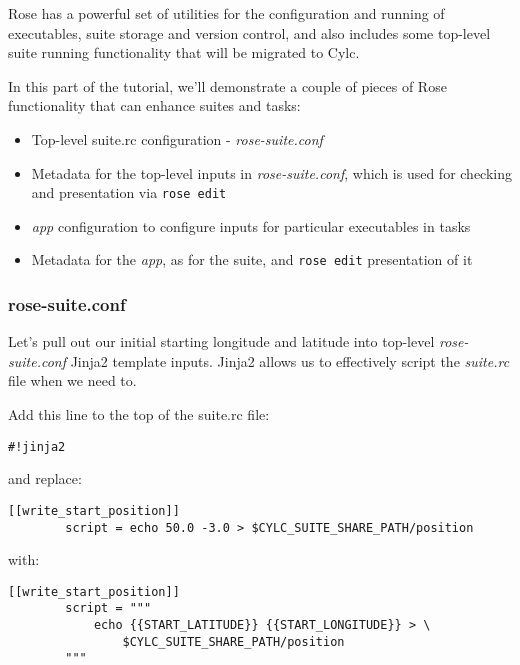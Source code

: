 Rose has a powerful set of utilities for the configuration and running of executables, suite
storage and version control, and also includes some top-level suite running functionality that will be migrated to Cylc.

In this part of the tutorial, we'll demonstrate a couple of pieces of Rose functionality that can enhance suites and
tasks:
\begin{itemize}
    \item{Top-level suite.rc configuration - {\em rose-suite.conf}}
    \item{Metadata for the top-level inputs in {\em rose-suite.conf}, which is used for checking and presentation via \lstinline{rose edit}}
    \item{{\em app} configuration to configure inputs for particular executables in tasks}
    \item{Metadata for the {\em app}, as for the suite, and \lstinline{rose edit} presentation of it}
\end{itemize}

\subsubsection{rose-suite.conf}

Let's pull out our initial starting longitude and latitude into top-level {\em rose-suite.conf} Jinja2 template inputs. Jinja2 allows us to effectively script the {\em suite.rc} file when we need to.

Add this line to the top of the suite.rc file:

\lstset{language=suiterc}
\begin{lstlisting}[columns=fullflexible]
#!jinja2
\end{lstlisting}

and replace:

\lstset{language=suiterc}
\begin{lstlisting}[columns=fullflexible]
    [[write_start_position]]
        script = echo 50.0 -3.0 > $CYLC_SUITE_SHARE_PATH/position
\end{lstlisting}

with:

\lstset{language=suiterc}
\begin{lstlisting}[columns=fullflexible]
    [[write_start_position]]
        script = """
            echo {{START_LATITUDE}} {{START_LONGITUDE}} > \
                $CYLC_SUITE_SHARE_PATH/position
        """
\end{lstlisting}

